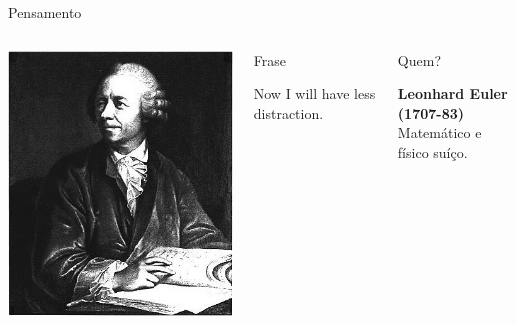 \documentclass[xcolor=dvipsnames,table]{beamer}
\begin{document}
	\begin{frame}{Pensamento}
		\begin{columns}
		  		\begin{center}
		    		\includegraphics[height=.5\textheight]{images/euler.png}
		  		\end{center}
				\begin{block}{Frase}
					\begin{center}
						{\large Now I will have less distraction.}
					\end{center}
				\end{block}		  		
		  		\begin{block}{Quem?}
		  			\begin{center}
						{\bf Leonhard Euler (1707-83)} \\ Matemático e físico suíço.
					\end{center}
				\end{block}
		\end{columns}
	\end{frame}
\end{document}
